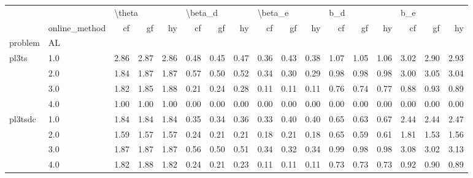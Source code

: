 \begin{tabular}{llrrrrrrrrrrrrrrr}
\toprule
        & {} & \multicolumn{3}{l}{\textbackslash theta} & \multicolumn{3}{l}{\textbackslash beta\_d} & \multicolumn{3}{l}{\textbackslash beta\_e} & \multicolumn{3}{l}{b\_d} & \multicolumn{3}{l}{b\_e} \\
        & online\_method &     cf &   gf &   hy &      cf &   gf &   hy &      cf &   gf &   hy &   cf &   gf &   hy &   cf &   gf &   hy \\
problem & AL &        &      &      &         &      &      &         &      &      &      &      &      &      &      &      \\
\midrule
pl3ts & 1.0 &   2.86 & 2.87 & 2.86 &    0.48 & 0.45 & 0.47 &    0.36 & 0.43 & 0.38 & 1.07 & 1.05 & 1.06 & 3.02 & 2.90 & 2.93 \\
        & 2.0 &   1.84 & 1.87 & 1.87 &    0.57 & 0.50 & 0.52 &    0.34 & 0.30 & 0.29 & 0.98 & 0.98 & 0.98 & 3.00 & 3.05 & 3.04 \\
        & 3.0 &   1.82 & 1.85 & 1.88 &    0.21 & 0.24 & 0.28 &    0.11 & 0.11 & 0.11 & 0.76 & 0.74 & 0.77 & 0.88 & 0.93 & 0.89 \\
        & 4.0 &   1.00 & 1.00 & 1.00 &    0.00 & 0.00 & 0.00 &    0.00 & 0.00 & 0.00 & 0.00 & 0.00 & 0.00 & 0.00 & 0.00 & 0.00 \\
pl3tsdc & 1.0 &   1.84 & 1.84 & 1.84 &    0.35 & 0.34 & 0.36 &    0.33 & 0.40 & 0.40 & 0.65 & 0.63 & 0.67 & 2.44 & 2.44 & 2.47 \\
        & 2.0 &   1.59 & 1.57 & 1.57 &    0.24 & 0.21 & 0.21 &    0.18 & 0.21 & 0.18 & 0.65 & 0.59 & 0.61 & 1.81 & 1.53 & 1.56 \\
        & 3.0 &   1.87 & 1.87 & 1.87 &    0.56 & 0.50 & 0.51 &    0.34 & 0.32 & 0.34 & 0.99 & 0.98 & 0.98 & 3.08 & 3.02 & 3.13 \\
        & 4.0 &   1.82 & 1.88 & 1.82 &    0.24 & 0.21 & 0.23 &    0.11 & 0.11 & 0.11 & 0.73 & 0.73 & 0.73 & 0.92 & 0.90 & 0.89 \\
\bottomrule
\end{tabular}
